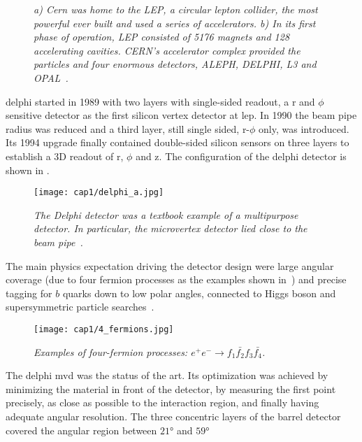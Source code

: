 \begin{figure}[!htbp]
  \centering {}
  \caption{\textit{a) Cern was home to the LEP, a circular lepton collider, the
      most powerful ever built and used a series of accelerators. b) In its
      first phase of operation, LEP consisted of 5176 magnets and 128
      accelerating cavities. CERN's accelerator complex provided the particles
      and four enormous detectors, ALEPH, DELPHI, L3 and OPAL~\cite{Cernlab}.}}
  \label{lep_figure}
\end{figure}

\hskip 1cm \gls{delphi} started in 1989 with two layers with single-sided
readout, a r and $\phi$ sensitive detector as the first silicon vertex detector
at \gls{lep}. In 1990 the beam pipe radius was reduced and a third layer, still
single sided, r-$\phi$ only, was introduced. Its 1994 upgrade finally contained
double-sided silicon sensors on three layers to establish a 3D readout of r,
$\phi$ and z. The configuration of the \gls{delphi} detector is shown in
.
\begin{figure}[!htbp]
  \centering\texttt{[image: cap1/delphi\_a.jpg]}
  \caption{\textit{The Delphi detector was a textbook example of a multipurpose
      detector. In particular, the microvertex detector lied close to the beam
      pipe~\cite{Hartmann}.}}\label{delphi_a}
\end{figure}
The main physics expectation driving the detector design were large angular
coverage (due to four fermion processes as the examples shown
in~) and precise tagging for $b$ quarks down to low polar
angles, connected to Higgs boson and supersymmetric particle
searches~\cite{Delphi_b}.
\begin{figure}[!htbp]
  \centering\texttt{[image: cap1/4\_fermions.jpg]}
  \caption{\textit{Examples of four-fermion processes:
      $e^{+}e^{-} \rightarrow f_{1} \bar{f_{2}} f_{3} \bar{f_{4}}
      $.}}\label{4_fermions}
\end{figure}
The \gls{delphi} \gls{mvd} was the status of the art. Its optimization was
achieved by minimizing the material in front of the detector, by measuring the
first point precisely, as close as possible to the interaction region, and
finally having adequate angular resolution.  The three concentric layers of the
barrel detector covered the angular region between $\ang{21}$ and $\ang{59}$
